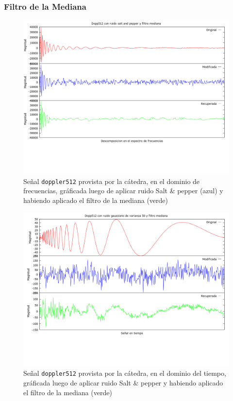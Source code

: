 \subsubsection{Filtro de la Mediana}

\begin{figure}[H]
\begin {center}
\includegraphics[width=500pt]{imagenes/dopp512-imp-median.png}
\end {center}
\caption{Se\~nal \texttt{doppler512} provista por la c\'atedra, en el dominio de frecuencias, gr\'aficada
luego de aplicar ruido Salt \& pepper (azul) y habiendo aplicado el filtro de la mediana (verde)}
\label{fig:medImp}
\end{figure}

\begin{figure}[H]
\begin {center}
\includegraphics[width=500pt]{imagenes/dopp512-gauss-50-imp-t.png}
\end {center}
\caption{Se\~nal \texttt{doppler512} provista por la c\'atedra, en el dominio del tiempo, gr\'aficada
luego de aplicar ruido Salt \& pepper y habiendo aplicado el filtro de la mediana (verde)}
\label{fig:medImp}
\end{figure}

